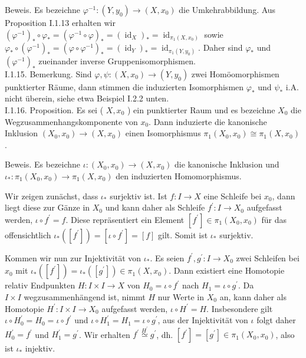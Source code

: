 \documentclass[10pt]{article}
\begin{document}
Beweis. Es bezeichne $\varphi^{-1}:\left(Y, y_{0}\right) \rightarrow\left(X, x_{0}\right)$ die Umkehrabbildung. Aus Proposition I.1.13 erhalten wir $\left(\varphi^{-1}\right)_{*} \circ \varphi_{*}=\left(\varphi^{-1} \circ \varphi\right)_{*}=\left(\operatorname{id}_{X}\right)_{*}=\operatorname{id}_{\pi_{1}\left(X, x_{0}\right)}$ sowie $\varphi_{*} \circ\left(\varphi^{-1}\right)_{*}=\left(\varphi \circ \varphi^{-1}\right)_{*}=\left(\operatorname{id}_{Y}\right)_{*}=\operatorname{id}_{\pi_{1}\left(Y, y_{0}\right)}$. Daher sind $\varphi_{*}$ und $\left(\varphi^{-1}\right)_{*}$ zueinander inverse Gruppenisomorphismen.\\
I.1.15. Bemerkung. Sind $\varphi, \psi:\left(X, x_{0}\right) \rightarrow\left(Y, y_{0}\right)$ zwei Homöomorphismen punktierter Räume, dann stimmen die induzierten Isomorphismen $\varphi_{*}$ und $\psi_{*}$ i.A. nicht überein, siehe etwa Beispiel I.2.2 unten.\\
I.1.16. Proposition. Es sei ( $X, x_{0}$ ) ein punktierter Raum und es bezeichne $X_{0}$ die Wegzusammenhangskomponente von $x_{0}$. Dann induzierte die kanonische Inklusion $\left(X_{0}, x_{0}\right) \rightarrow\left(X, x_{0}\right)$ einen Isomorphismus $\pi_{1}\left(X_{0}, x_{0}\right) \cong \pi_{1}\left(X, x_{0}\right)$.

Beweis. Es bezeichne $\iota:\left(X_{0}, x_{0}\right) \rightarrow\left(X, x_{0}\right)$ die kanonische Inklusion und $\iota_{*}: \pi_{1}\left(X_{0}, x_{0}\right) \rightarrow \pi_{1}\left(X, x_{0}\right)$ den induzierten Homomorphismus.

Wir zeigen zunächst, dass $\iota_{*}$ surjektiv ist. Ist $f: I \rightarrow X$ eine Schleife bei $x_{0}$, dann liegt diese zur Gänze in $X_{0}$ und kann daher als Schleife $f^{\prime}: I \rightarrow X_{0}$ aufgefasst werden, $\iota \circ f^{\prime}=f$. Diese repräsentiert ein Element $\left[f^{\prime}\right] \in \pi_{1}\left(X_{0}, x_{0}\right)$ für das offensichtlich $\iota_{*}\left(\left[f^{\prime}\right]\right)=\left[\iota \circ f^{\prime}\right]=[f]$ gilt. Somit ist $\iota_{*}$ surjektiv.

Kommen wir nun zur Injektivität von $\iota_{*}$. Es seien $f^{\prime}, g^{\prime}: I \rightarrow X_{0}$ zwei Schleifen bei $x_{0}$ mit $\iota_{*}\left(\left[f^{\prime}\right]\right)=\iota_{*}\left(\left[g^{\prime}\right]\right) \in \pi_{1}\left(X, x_{0}\right)$. Dann existiert eine Homotopie relativ Endpunkten $H: I \times I \rightarrow X$ von $H_{0}=\iota \circ f^{\prime}$ nach $H_{1}=\iota \circ g^{\prime}$. Da\\
$I \times I$ wegzusammenhängend ist, nimmt $H$ nur Werte in $X_{0}$ an, kann daher als Homotopie $H^{\prime}: I \times I \rightarrow X_{0}$ aufgefasst werden, $\iota \circ H^{\prime}=H$. Insbesondere gilt $\iota \circ H_{0}^{\prime}=H_{0}=\iota \circ f^{\prime}$ und $\iota \circ H_{1}^{\prime}=H_{1}=\iota \circ g^{\prime}$, aus der Injektivität von $\iota$ folgt daher $H_{0}^{\prime}=f^{\prime}$ und $H_{1}^{\prime}=g^{\prime}$. Wir erhalten $f^{\prime} \stackrel{H^{\prime}}{\simeq} g^{\prime}$, dh. $\left[f^{\prime}\right]=\left[g^{\prime}\right] \in \pi_{1}\left(X_{0}, x_{0}\right)$, also ist $\iota_{*}$ injektiv.
\end{document}

